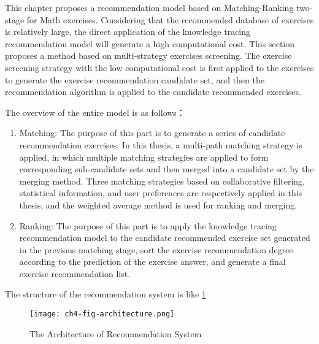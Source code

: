 This chapter proposes a recommendation model based on Matching-Ranking two-stage for Math exercises. Considering that the recommended database of exercises is relatively large, the direct application of the knowledge tracing recommendation model will generate a high computational cost. This section proposes a method based on multi-strategy exercises screening. The exercise screening strategy with the low computational cost is first applied to the exercises to generate the exercise recommendation candidate set, and then the recommendation algorithm is applied to the candidate recommended exercises.



The overview of the entire model is as follows：
\begin{enumerate}
  \item Matching: The purpose of this part is to generate a series of candidate recommendation exercises. In this thesis, a multi-path matching strategy is applied, in which multiple matching strategies are applied to form corresponding sub-candidate sets and then merged into a candidate set by the merging method. Three matching strategies based on collaborative filtering, statistical information, and user preferences are respectively applied in this thesis, and the weighted average method is used for ranking and merging.
  \item Ranking: The purpose of this part is to apply the knowledge tracing recommendation model to the candidate recommended exercise set generated in the previous matching stage, sort the exercise recommendation degree according to the prediction of the exercise answer, and generate a final exercise recommendation list.
\end{enumerate}

The structure of the recommendation system is like \figurename{\ref{fig:ch4-fig0}}

\begin{figure}[htbp!]
  \centering
  \texttt{[image: ch4-fig-architecture.png]}
  \caption{The Architecture of Recommendation System}\label{fig:ch4-fig0}
\end{figure}

